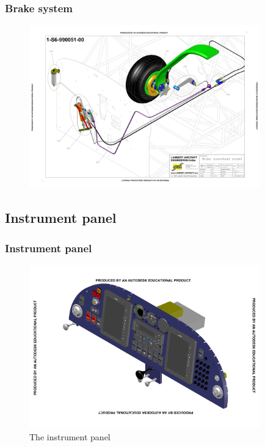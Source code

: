 \documentclass{beamer}
\begin{document}
\begin{frame}\frametitle{Brake system}
\begin{figure}[ht!]
	\begin{center}
		\includegraphics[width=10cm,trim = 1.5cm 2.5cm 1.5cm 2.5cm, clip]{pics/PIC019.pdf}
		\label{fig:PIC019}
	\end{center}
\end{figure}
\end{frame}

\subsection{Instrument panel}

\begin{frame}\frametitle{Instrument panel}
\begin{figure}[ht!]
	\begin{center}
		\includegraphics[width=10cm,trim = 2cm 2.2cm 2cm 2.2cm, clip]{pics/PIC016.pdf}
		\caption{The instrument panel}
		\label{fig:PIC016}
	\end{center}
\end{figure}
\end{frame}
\end{document}
